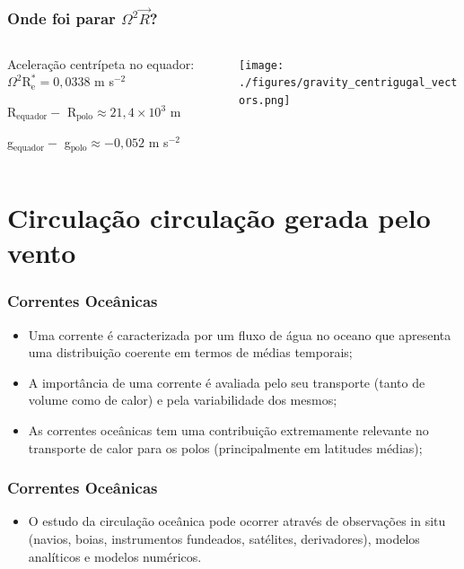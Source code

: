 \begin{frame}
  \frametitle{Onde foi parar $\Omega^2\vec{R}$?}

  \begin{columns}
    \begin{column}{0.5\textwidth}
    \small{
      Aceleração centrípeta no equador:
      $\Omega^2\text{R}_{\text{e}}^{*} = 0,0338$ m s$^{-2}$

      R$_{\text{equador}} -$ R$_{\text{polo}} \approx 21,4 \times 10^{3}$ m

      g$_{\text{equador}} -$ g$_{\text{polo}} \approx -0,052$ m s$^{-2}$
      }
    \end{column}
    \begin{column}{0.5\textwidth}
      \begin{center}
        \texttt{[image: ./figures/gravity\_centrigugal\_vectors.png]}
      \end{center}
    \end{column}
  \end{columns}
\end{frame}

\section{Circulação circulação gerada pelo vento}
\begin{frame}
\frametitle{Correntes Oceânicas}
  \begin{itemize}[<+-| alert@+>]
    \item Uma corrente é caracterizada por um fluxo de água no oceano que
          apresenta uma distribuição coerente em termos de médias temporais;
    \item A importância de uma corrente é avaliada pelo seu transporte (tanto
          de volume como de calor) e pela variabilidade dos mesmos;
    \item As correntes oceânicas tem uma contribuição extremamente relevante no
          transporte de calor para os polos (principalmente em latitudes médias);
  \end{itemize}
\end{frame}


\begin{frame}
\frametitle{Correntes Oceânicas}
  \begin{itemize}[<+-| alert@+>]
    \item O estudo da circulação oceânica pode ocorrer através de observações
          in situ (navios, boias, instrumentos fundeados, satélites,
          derivadores), modelos analíticos e modelos numéricos.
  \end{itemize}
\end{frame}


